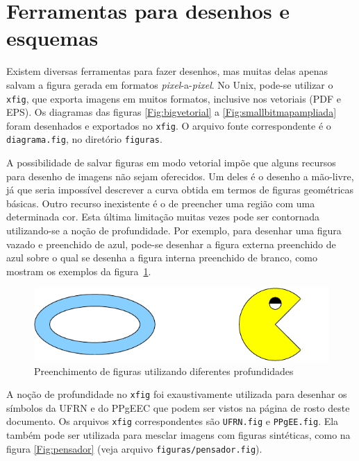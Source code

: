 \section{Ferramentas para desenhos e esquemas}
\label{Sec:desenhos}

Existem diversas ferramentas para fazer desenhos, mas muitas delas
apenas salvam a figura gerada em formatos \emph{pixel}-a-\emph{pixel}.
No Unix, pode-se utilizar o \texttt{xfig}, que exporta imagens em
muitos formatos, inclusive nos vetoriais (PDF e EPS). Os diagramas das
figuras \ref{Fig:bigvetorial} a \ref{Fig:smallbitmapampliada} foram
desenhados e exportados no \texttt{xfig}. O arquivo fonte
correspondente é o \texttt{diagrama.fig}, no diretório
\texttt{figuras}.

A possibilidade de salvar figuras em modo vetorial impõe que alguns
recursos para desenho de imagens não sejam oferecidos. Um deles é o
desenho a mão-livre, já que seria impossível descrever a curva obtida
em termos de figuras geométricas básicas. Outro recurso inexistente é
o de preencher uma região com uma determinada cor. Esta última
limitação muitas vezes pode ser contornada utilizando-se a noção de
profundidade.  Por exemplo, para desenhar uma figura vazado e
preenchido de azul, pode-se desenhar a figura externa preenchido de
azul sobre o qual se desenha a figura interna preenchido de branco,
como mostram os exemplos da figura~\ref{Fig:circulo}.

\begin{figure}[htb] \begin{center}
\includegraphics{./figuras/circulo}
\caption{Preenchimento de figuras utilizando diferentes profundidades}
\label{Fig:circulo}
\end{center} \end{figure}

A noção de profundidade no \texttt{xfig} foi exaustivamente utilizada
para desenhar os símbolos da UFRN e do PPgEEC que podem ser vistos na
página de rosto deste documento. Os arquivos \texttt{xfig}
correspondentes são \texttt{UFRN.fig} e \texttt{PPgEE.fig}. Ela também
pode ser utilizada para mesclar imagens com figuras sintéticas, como
na figura \ref{Fig:pensador} (veja arquivo \texttt{figuras/pensador.fig}).

